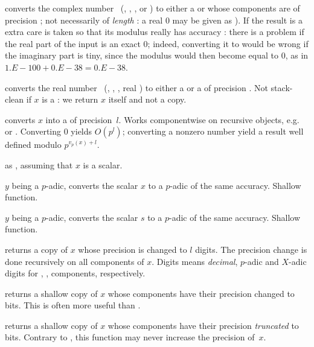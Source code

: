  converts the complex number~
(, , ,  or ) to either
a  or  whose components are  of precision
; not necessarily of \emph{length} : a real $0$ may be
given as ). If the result is a  extra care is
taken so that its modulus really has accuracy : there is a problem
if the real part of the input is an exact $0$; indeed, converting it to
 would be wrong if the imaginary part is tiny, since the
modulus would then become equal to $0$, as in $1.E-100 + 0.E-38 = 0.E-38$.

 converts the real number~
(, , , real ) to either
a  or a  of precision . Not stack-clean
if $x$ is a : we return $x$ itself and not a copy.

 converts $x$ into a 
of precision~$l$. Works componentwise on recursive objects,
e.g.~ or . Converting $0$ yields $O(p^l)$; converting a
nonzero number yield a result well defined modulo $p^{v_p(x) + l}$.

 as , assuming that $x$
is a scalar.

 $y$ being a $p$-adic, converts the scalar $x$
to a $p$-adic of the same accuracy. Shallow function.

 $y$ being a $p$-adic, converts the scalar $s$
to a $p$-adic of the same accuracy. Shallow function.

 returns a copy of $x$ whose precision is
changed to $l$ digits. The precision change is done recursively on all
components of $x$. Digits means \emph{decimal}, $p$-adic and $X$-adic digits
for , ,  components, respectively.

 returns a shallow copy of $x$ whose
 components have their precision changed to  bits.
This is often more useful than .

 returns a shallow copy of $x$ whose
 components have their precision \emph{truncated} to 
bits. Contrary to , this function may never increase
the precision of~$x$.

